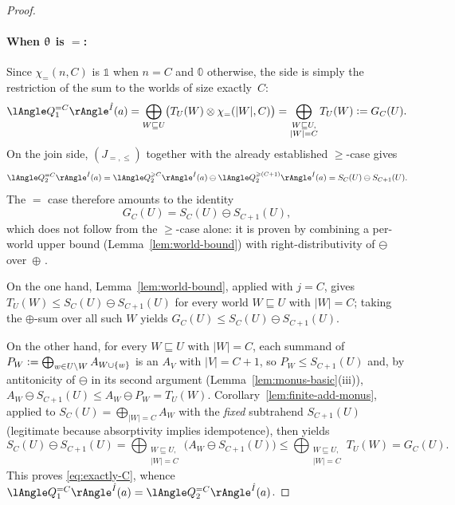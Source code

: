 \begin{proof}
\paragraph*{\textbf{When $\mathrel{\uptheta}$ is $=$:}}
Since $\chi_{=}(n,C)$ is $\mathbb 1$ when $n=C$ and $\mathbb 0$ otherwise, the
 side is simply the restriction of the sum to the worlds of size
exactly~$C$:
\[
\angsem{\hat I}{Q^{=C}_1}(a)
=\bigoplus_{W\sqsubseteq U}\bigl(T_{U}(W)\otimes\chi_{=}(|W|,C)\bigr)
=\bigoplus_{\substack{W\sqsubseteq U,\\ |W|=C}} T_{U}(W)
\defeq G_C(U).
\]
On the join side, $(J_{=,\le})$ together with the already established
$\ge$-case gives
\[
\angsem{\hat I}{Q^{=C}_2}(a)
=\angsem{\hat I}{Q^{\ge C}_2}(a)\ominus\angsem{\hat I}{Q^{\ge(C+1)}_2}(a)
=S_C(U)\ominus S_{C+1}(U).
\]
The $=$ case therefore amounts to the identity
\begin{equation}\label{eq:exactly-C}
G_C(U)=S_C(U)\ominus S_{C+1}(U),
\end{equation}
which does not follow from the $\ge$-case alone: it is proven by combining
a per-world upper bound (Lemma~\ref{lem:world-bound}) with
right-distributivity of $\ominus$ over~$\oplus$
.

On the one hand, Lemma~\ref{lem:world-bound}, applied with $j=C$, gives
$T_U(W)\le S_C(U)\ominus S_{C+1}(U)$ for every world $W\sqsubseteq U$ with
$|W|=C$; taking the $\oplus$-sum over all such $W$ yields
$G_C(U)\le S_C(U)\ominus S_{C+1}(U)$.

On the other hand, for every $W\sqsubseteq U$ with $|W|=C$, each summand of
$P_W\mathrel{\mathop:}=\bigoplus_{w\in U\setminus W}A_{W\cup\{w\}}$ is an $A_V$ with
$|V|=C+1$, so $P_W\le S_{C+1}(U)$ and, by antitonicity of $\ominus$ in its
second argument (Lemma~\ref{lem:monus-basic}(iii)),
$A_W\ominus S_{C+1}(U)\le A_W\ominus P_W=T_U(W)$.
Corollary~\ref{lem:finite-add-monus}, applied to
$S_C(U)=\bigoplus_{|W|=C}A_W$ with the \emph{fixed} subtrahend $S_{C+1}(U)$
(legitimate because absorptivity implies idempotence), then yields
\[
S_C(U)\ominus S_{C+1}(U)
=\bigoplus_{\substack{W\sqsubseteq U,\\|W|=C}}\bigl(A_W\ominus S_{C+1}(U)\bigr)
\le\bigoplus_{\substack{W\sqsubseteq U,\\|W|=C}}T_U(W)=G_C(U).
\]
This proves \eqref{eq:exactly-C}, whence
$\angsem{\hat I}{Q^{=C}_1}(a)=\angsem{\hat I}{Q^{=C}_2}(a)$.


\end{proof}
